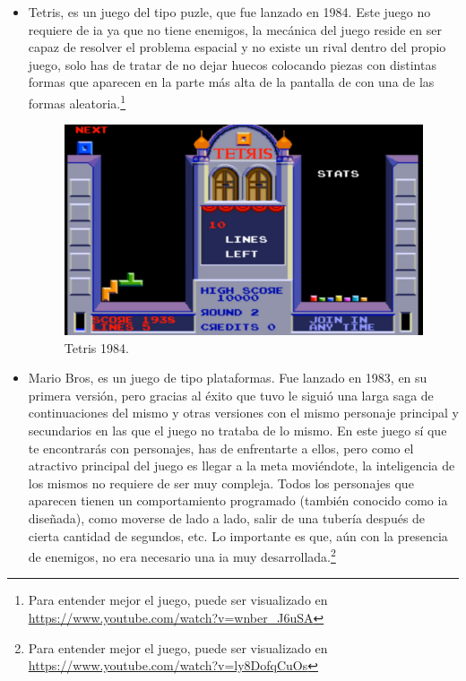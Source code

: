 \begin{itemize}
	\item Tetris, es un juego del tipo puzle, que fue lanzado en 1984. Este juego no requiere de \gls{ia} ya que no tiene enemigos, la mecánica del juego reside en ser capaz de resolver el problema espacial y no existe un rival dentro del propio juego, solo has de tratar de no dejar huecos colocando piezas con distintas formas que aparecen en la parte más alta de la pantalla de con una de las formas aleatoria.\footnote{Para entender mejor el juego, puede ser visualizado en \url{https://www.youtube.com/watch?v=wnber_J6uSA}}
	\begin{figure}[h]
		\centering
		\includegraphics[width=15cm]{archivos/imagenes/tetris-1984.png}
		\caption{Tetris 1984.}
	\end{figure}
	\item Mario Bros, es un juego de tipo plataformas. Fue lanzado en 1983, en su primera versión, pero gracias al éxito que tuvo le siguió una larga saga de continuaciones del mismo y otras versiones con el mismo personaje principal y secundarios en las que el juego no trataba de lo mismo. En este juego sí que te encontrarás con personajes, has de enfrentarte a ellos, pero como el atractivo principal del juego es llegar a la meta moviéndote, la inteligencia de los mismos no requiere de ser muy compleja. Todos los personajes que aparecen tienen un comportamiento programado (también conocido como \gls{ia} diseñada), como moverse de lado a lado, salir de una tubería después de cierta cantidad de segundos, etc. Lo importante es que, aún con la presencia de enemigos, no era necesario una \gls{ia} muy desarrollada.\footnote{Para entender mejor el juego, puede ser visualizado en \url{https://www.youtube.com/watch?v=ly8DofqCuOs}}
	\begin{figure}[h]

\end{figure}
\end{itemize}
